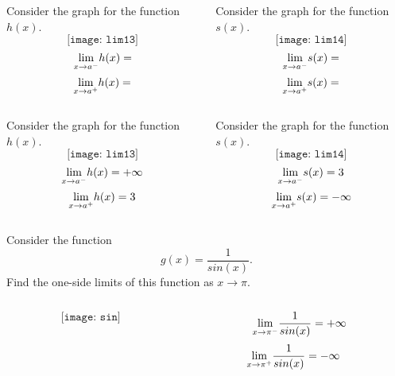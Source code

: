 \documentclass{beamer}
\begin{document}
\begin{frame}
\begin{columns}
	\begin{column}{0.48\textwidth}
		\begin{Example}
			Consider the graph for the function $h(x)$.
			$$
			\texttt{[image: lim13]}
			$$
			$$
			\underset{x\rightarrow a^-}{\rm lim}h(x)= $$$$
			\underset{x\rightarrow a^+}{\rm lim}h(x)=  $$
		\end{Example}	
	\end{column}
	\begin{column}{0.48\textwidth}
		\begin{Example}
			Consider the graph for the function $s(x)$.
			$$
			\texttt{[image: lim14]}
			$$
			$$
			\underset{x\rightarrow a^-}{\rm lim}s(x)= $$ $$
			\underset{x\rightarrow a^+}{\rm lim}s(x)= $$  
		\end{Example}
	\end{column}
\end{columns}


\end{frame}

\begin{frame}
\begin{columns}
	\begin{column}{0.48\textwidth}
			\begin{Example}
			Consider the graph for the function $h(x)$.
			$$
			\texttt{[image: lim13]}
			$$
			$$
			\underset{x\rightarrow a^-}{\rm lim}h(x)=+\infty $$$$
			\underset{x\rightarrow a^+}{\rm lim}h(x)= 3 $$
		\end{Example}	
	\end{column}
	\begin{column}{0.48\textwidth}
		\begin{Example}
			Consider the graph for the function $s(x)$.
			$$
			\texttt{[image: lim14]}
			$$
			$$
			\underset{x\rightarrow a^-}{\rm lim}s(x)=3 $$ $$
			\underset{x\rightarrow a^+}{\rm lim}s(x)=-\infty $$  
		\end{Example}
\end{column}
\end{columns}
	

\end{frame}


\begin{frame}
\begin{Example}
	Consider the function $$g(x)=\frac{1}{sin(x)}.$$ Find the one-side limits of this function as $x\rightarrow \pi$.
\end{Example}
\begin{columns}
	\begin{column}{.48\textwidth}
	$$
	\texttt{[image: sin]}
	$$
	\end{column}
\begin{column}{.48\textwidth}
		$$\underset{x\rightarrow \pi^-}{\rm lim}\frac{1}{sin(x)}=+\infty $$$$ \underset{x\rightarrow \pi^+}{\rm lim}\frac{1}{sin(x)}=-\infty \quad $$ 
\end{column}
\end{columns}


\end{frame}
\end{document}
